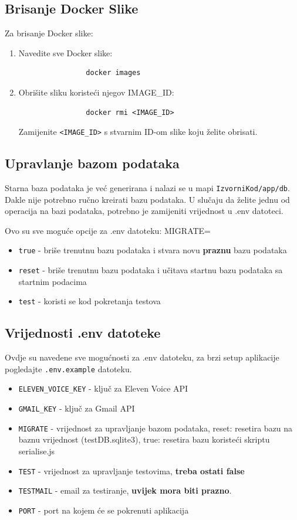 		\subsection*{Brisanje Docker Slike}
		Za brisanje Docker slike:
		\begin{enumerate}
			\item Navedite sve Docker slike:
			\begin{verbatim}
				docker images
			\end{verbatim}
			\item Obrišite sliku koristeći njegov IMAGE\_ID:
			\begin{verbatim}
				docker rmi <IMAGE_ID>
			\end{verbatim}
			Zamijenite \texttt{<IMAGE\_ID>} s stvarnim ID-om slike koju želite obrisati.
		\end{enumerate}

		\subsection*{Upravlanje bazom podataka}
			Starna baza podataka je već generirana i nalazi se u mapi \texttt{IzvorniKod/app/db}.
			Dakle nije potrebno ručno kreirati bazu podataka.
			U slučaju da želite jednu od operacija na bazi podataka, potrebno je zamijeniti vrijednost u .env datoteci.

			Ovo su sve moguće opcije za .env datoteku:
			MIGRATE=
			\begin{itemize}
				\item \texttt{true} - briše trenutnu bazu podataka i stvara novu \textbf{praznu} bazu podataka
				\item \texttt{reset} - briše trenutnu bazu podataka i učitava startnu bazu podataka sa startnim podacima
				\item \texttt{test} - koristi se kod pokretanja testova 
			\end{itemize}
	
		\subsection*{Vrijednosti .env datoteke}
			Ovdje su navedene sve mogućnosti za .env datoteku, za brzi setup aplikacije pogledajte \texttt{.env.example} datoteku.
			\begin{itemize}
				\item \texttt{ELEVEN\_VOICE\_KEY} - ključ za Eleven Voice API
				\item \texttt{GMAIL\_KEY} - ključ za Gmail API
				\item \texttt{MIGRATE} - vrijednost za upravljanje bazom podataka, reset: resetira bazu na baznu vrijednost (testDB.sqlite3), true: resetira bazu koristeći skriptu serialise.js
				\item \texttt{TEST} - vrijednost za upravljanje testovima, \textbf{treba ostati false}
				\item \texttt{TESTMAIL} - email za testiranje, \textbf{uvijek mora biti prazno}.
				\item \texttt{PORT} - port na kojem će se pokrenuti aplikacija
			\end{itemize}
		
